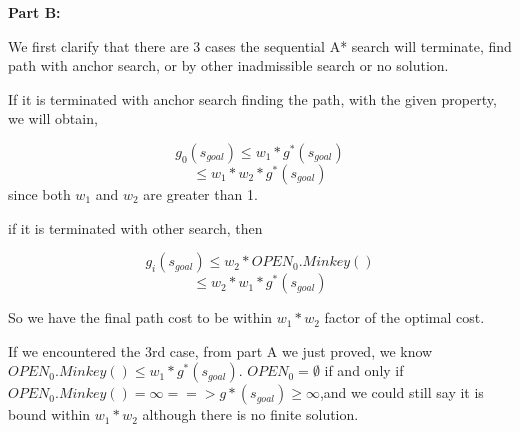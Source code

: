 \documentclass[12pt, letterpaper]{article}
\begin{document}
\bigskip

\noindent \textbf{Part B:}

\noindent We first clarify that there are 3 cases the sequential A* search will terminate, find path with anchor search, or by other inadmissible search or no solution.
 
\medskip

\noindent If it is terminated with anchor search finding the path, with the given property, we will obtain,

$$g_0(s_{goal}) \leq w_1 * g^*(s_{goal})$$
$$\leq w_1 * w_2 * g^*(s_{goal})$$ since both $ w_1 $ and $ w_2 $ are greater than 1.

\medskip

\noindent if it is terminated with other search, then

$$g_i(s_{goal}) \leq w_2 * OPEN_0.Minkey()$$
$$\leq w_2*w_1*g^*(s_{goal})$$

So we have the final path cost to be within $ w_1*w_2 $ factor of the optimal cost.

If we encountered the 3rd case, from part A we just proved, we know $ OPEN_0.Minkey() \leq w_1 * g^*(s_{goal}) $. $OPEN_0=\emptyset$ if and only if $OPEN_0.Minkey() = \infty ==> g*(s_{goal}) \geq \infty$,and we could still say it is bound within $ w_1*w_2 $ although there is no finite solution. 
\end{document}
